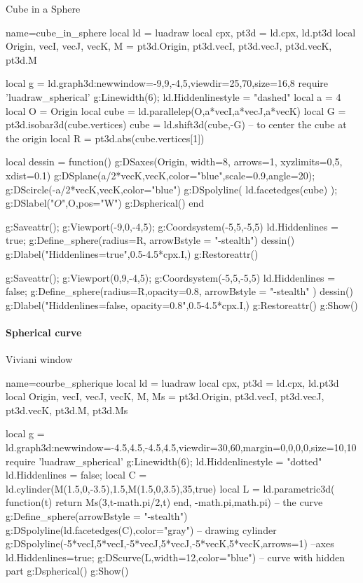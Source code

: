 \begin{demo}{Cube in a Sphere}
\begin{luadraw}{name=cube_in_sphere}
local ld = luadraw
local cpx, pt3d = ld.cpx, ld.pt3d
local Origin, vecI, vecJ, vecK, M = pt3d.Origin, pt3d.vecI, pt3d.vecJ, pt3d.vecK, pt3d.M

local g = ld.graph3d:new{window={-9,9,-4,5},viewdir={25,70},size={16,8}}
require 'luadraw_spherical'
g:Linewidth(6); ld.Hiddenlinestyle = "dashed"
local a = 4
local O = Origin
local cube = ld.parallelep(O,a*vecI,a*vecJ,a*vecK)
local G = pt3d.isobar3d(cube.vertices)
cube = ld.shift3d(cube,-G) -- to center the cube at the origin
local R = pt3d.abs(cube.vertices[1])

local dessin = function()
    g:DSaxes(Origin, {width=8, arrows=1, xyzlimits={0,5}, xdist=0.1})
    g:DSplane({a/2*vecK,vecK},{color="blue",scale=0.9,angle=20}); 
    g:DScircle({-a/2*vecK,vecK},{color="blue"})
    g:DSpolyline( ld.facetedges(cube) ); g:DSlabel("$O$",O,{pos="W"})
    g:Dspherical()
end

g:Saveattr(); g:Viewport(-9,0,-4,5); g:Coordsystem(-5,5,-5,5)
ld.Hiddenlines = true; g:Define_sphere({radius=R, arrowBstyle = "-stealth"})
dessin()
g:Dlabel("Hiddenlines=true",0.5-4.5*cpx.I,{})
g:Restoreattr()

g:Saveattr(); g:Viewport(0,9,-4,5); g:Coordsystem(-5,5,-5,5)
ld.Hiddenlines = false; g:Define_sphere({radius=R,opacity=0.8, arrowBstyle = "-stealth"} )
dessin()
g:Dlabel("Hiddenlines=false, opacity=0.8",0.5-4.5*cpx.I,{})
g:Restoreattr()
g:Show()
\end{luadraw}
\end{demo}

\paragraph{Spherical curve}

\begin{demo}{Viviani window}
\begin{luadraw}{name=courbe_spherique}
local ld = luadraw
local cpx, pt3d = ld.cpx, ld.pt3d
local Origin, vecI, vecJ, vecK, M, Ms = pt3d.Origin, pt3d.vecI, pt3d.vecJ, pt3d.vecK, pt3d.M, pt3d.Ms

local g = ld.graph3d:new{window={-4.5,4.5,-4.5,4.5},viewdir={30,60},margin={0,0,0,0},size={10,10}}
require 'luadraw_spherical'
g:Linewidth(6); ld.Hiddenlinestyle = "dotted"
ld.Hiddenlines = false; 
local C = ld.cylinder(M(1.5,0,-3.5),1.5,M(1.5,0,3.5),35,true)
local L = ld.parametric3d( function(t) return Ms(3,t-math.pi/2,t) end, -math.pi,math.pi) -- the curve
g:Define_sphere({arrowBstyle = "-stealth"})
g:DSpolyline(ld.facetedges(C),{color="gray"}) -- drawing cylinder
g:DSpolyline({{-5*vecI,5*vecI},{-5*vecJ,5*vecJ},{-5*vecK,5*vecK}},{arrows=1}) --axes
ld.Hiddenlines=true; g:DScurve(L,{width=12,color="blue"}) -- curve with hidden part
g:Dspherical()
g:Show()
\end{luadraw}
\end{demo}

